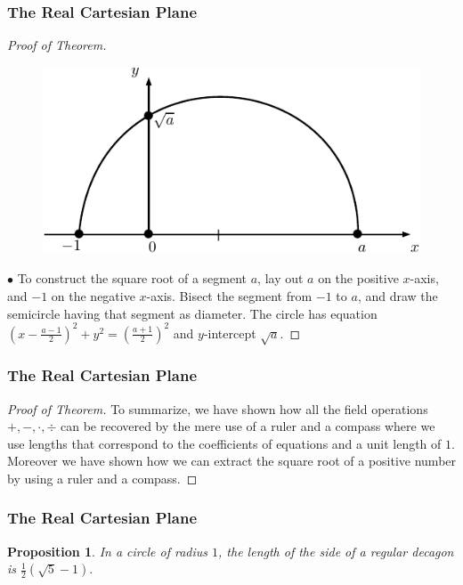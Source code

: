 \documentclass[compress,mathserif,serif]{beamer}
\newtheorem{prop}{Proposition}
\begin{document}
\begin{frame}
\frametitle{The Real Cartesian Plane}
\begin{proof}[Proof of Theorem]\let\qed\relax
\begin{figure}[hbtp]
\centering
\includegraphics[scale=1]{sqrt.pdf}
\end{figure}
$\bullet$ To construct the square root of a segment $a$, lay out $a$ on the positive $x$-axis, and $-1$ on the negative $x$-axis. Bisect the segment from $-1$ to $a$, and draw the semicircle having that segment as diameter. The circle has equation $\left(x - \frac{a-1}{2}\right)^2 + y^2 = \left( \frac{a+1}{2}\right)^2 $ and $y$-intercept $\sqrt{a}.$
\end{proof}

\end{frame}



\begin{frame}
\frametitle{The Real Cartesian Plane}
\begin{proof}[Proof of Theorem]
To summarize, we have shown how all the field operations $+,-, \cdot , \div$ can be recovered by the mere use of a ruler and a compass where we use lengths that correspond to the coefficients of equations and a unit length of $1$. Moreover we have shown how we can extract the square root of a positive number by using a ruler and a compass. 
\end{proof}
\end{frame}


\begin{frame}
\frametitle{The Real Cartesian Plane}
\begin{prop} In a circle of radius $1$, the length of the side of a regular decagon is $\frac{1}{2}( \sqrt{5}-1).$
\end{prop}

\end{frame}
\end{document}
